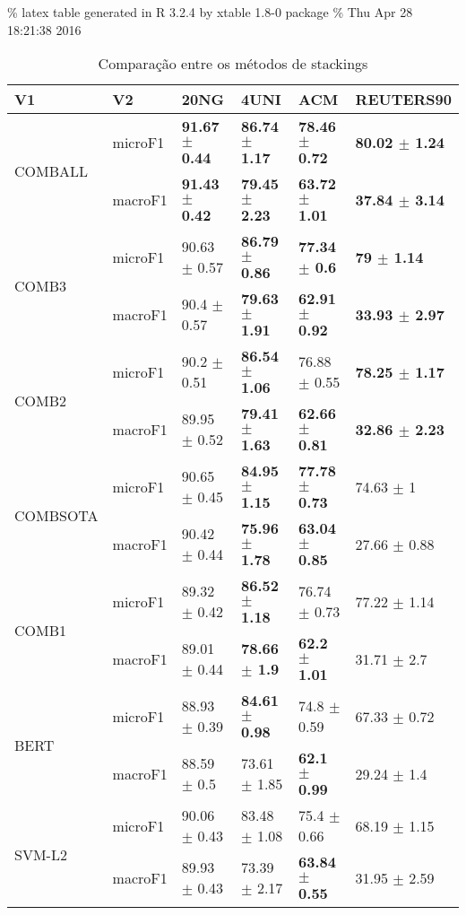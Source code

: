 \documentclass[]{book}
\begin{document}
\% latex table generated in R 3.2.4 by xtable 1.8-0 package \% Thu Apr
28 18:21:38 2016

\begin{table}[ht]
\centering
\begin{tabular}{llllll}
  \hline
V1 & V2 & 20NG & 4UNI & ACM & REUTERS90 \\ 
  \cline{3-6} \hline
\multirow{2}{*}{COMBALL} & microF1 & \bf{91.67 $\pm$  0.44} & \bf{86.74 $\pm$  1.17} & \bf{78.46 $\pm$  0.72} & \bf{80.02 $\pm$  1.24} \\ 
   & macroF1 & \bf{91.43 $\pm$  0.42} & \bf{79.45 $\pm$  2.23} & \bf{63.72 $\pm$  1.01} & \bf{37.84 $\pm$  3.14} \\ 
   \cline{3-6}\multirow{2}{*}{COMB3} & microF1 & 90.63 $\pm$  0.57 & \bf{86.79 $\pm$  0.86} & \bf{77.34 $\pm$  0.6} & \bf{79 $\pm$  1.14} \\ 
   & macroF1 & 90.4 $\pm$  0.57 & \bf{79.63 $\pm$  1.91} & \bf{62.91 $\pm$  0.92} & \bf{33.93 $\pm$  2.97} \\ 
   \cline{3-6}\multirow{2}{*}{COMB2} & microF1 & 90.2 $\pm$  0.51 & \bf{86.54 $\pm$  1.06} & 76.88 $\pm$  0.55 & \bf{78.25 $\pm$  1.17} \\ 
   & macroF1 & 89.95 $\pm$  0.52 & \bf{79.41 $\pm$  1.63} & \bf{62.66 $\pm$  0.81} & \bf{32.86 $\pm$  2.23} \\ 
   \cline{3-6}\multirow{2}{*}{COMBSOTA} & microF1 & 90.65 $\pm$  0.45 & \bf{84.95 $\pm$  1.15} & \bf{77.78 $\pm$  0.73} & 74.63 $\pm$  1 \\ 
   & macroF1 & 90.42 $\pm$  0.44 & \bf{75.96 $\pm$  1.78} & \bf{63.04 $\pm$  0.85} & 27.66 $\pm$  0.88 \\ 
   \cline{3-6}\multirow{2}{*}{COMB1} & microF1 & 89.32 $\pm$  0.42 & \bf{86.52 $\pm$  1.18} & 76.74 $\pm$  0.73 & 77.22 $\pm$  1.14 \\ 
   & macroF1 & 89.01 $\pm$  0.44 & \bf{78.66 $\pm$  1.9} & \bf{62.2 $\pm$  1.01} & 31.71 $\pm$  2.7 \\ 
   \cline{3-6}\multirow{2}{*}{BERT} & microF1 & 88.93 $\pm$  0.39 & \bf{84.61 $\pm$  0.98} & 74.8 $\pm$  0.59 & 67.33 $\pm$  0.72 \\ 
   & macroF1 & 88.59 $\pm$  0.5 & 73.61 $\pm$  1.85 & \bf{62.1 $\pm$  0.99} & 29.24 $\pm$  1.4 \\ 
   \cline{3-6}\multirow{2}{*}{SVM-L2} & microF1 & 90.06 $\pm$  0.43 & 83.48 $\pm$  1.08 & 75.4 $\pm$  0.66 & 68.19 $\pm$  1.15 \\ 
   & macroF1 & 89.93 $\pm$  0.43 & 73.39 $\pm$  2.17 & \bf{63.84 $\pm$  0.55} & 31.95 $\pm$  2.59 \\ 
   \cline{3-6}\end{tabular}
\caption{Comparação entre os métodos de stackings} 
\label{tab:stacking}
\end{table}

\renewcommand\refname{References}

\end{document}
